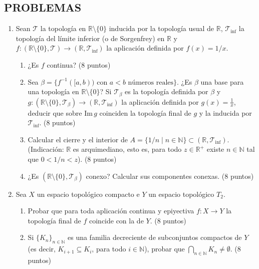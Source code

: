 \subsection*{PROBLEMAS}
\begin{enumerate}
    \item Sean $\mathcal{T}$ la topología en $\mathbb{R} \setminus \{0\}$ inducida por la topología usual de $\mathbb{R}$, $\mathcal{T}_{\inf}$ la topología del límite inferior (o de Sorgenfrey) en $\mathbb{R}$ y $f: (\mathbb{R} \setminus \{0\}, \mathcal{T}) \to (\mathbb{R}, \mathcal{T}_{\inf})$ la aplicación definida por $f(x) = 1/x$.
    \begin{enumerate}[label=(\alph*)]
        \item ¿Es $f$ continua? \hfill (8 puntos)
        \item Sea $\beta = \{f^{-1}([a, b)) \text{ con } a < b \text{ números reales}\}$. ¿Es $\beta$ una base para una topología en $\mathbb{R} \setminus \{0\}$? Si $\mathcal{T}_\beta$ es la topología definida por $\beta$ y $g: (\mathbb{R} \setminus \{0\}, \mathcal{T}_\beta) \to (\mathbb{R}, \mathcal{T}_{\inf})$ la aplicación definida por $g(x) = \frac{1}{x}$, deducir que sobre $\text{Im}\,g$ coinciden la topología final de $g$ y la inducida por $\mathcal{T}_{\inf}$. \hfill (8 puntos)
        \item Calcular el cierre y el interior de $A = \{1/n \mid n \in \mathbb{N}\} \subset (\mathbb{R}, \mathcal{T}_{\inf})$. (Indicación: $\mathbb{R}$ es arquimediano, esto es, para todo $z \in \mathbb{R}^+$ existe $n \in \mathbb{N}$ tal que $0 < 1/n < z$). \hfill (8 puntos)
        \item ¿Es $(\mathbb{R} \setminus \{0\}, \mathcal{T}_\beta)$ conexo? Calcular sus componentes conexas. \hfill (8 puntos)
    \end{enumerate}
    
    \item Sea $X$ un espacio topológico compacto e $Y$ un espacio topológico $T_2$.
    \begin{enumerate}[label=(\alph*)]
        \item Probar que para toda aplicación continua y epiyectiva $f: X \to Y$ la topología final de $f$ coincide con la de $Y$. \hfill (8 puntos)
        \item Si $\{K_n\}_{n \in \mathbb{N}}$ es una familia decreciente de subconjuntos compactos de $Y$ (es decir, $K_{i+1} \subseteq K_i$, para todo $i \in \mathbb{N}$), probar que $\displaystyle \bigcap_{n \in \mathbb{N}} K_n \neq \emptyset$. \hfill (8 puntos)
    \end{enumerate}
\end{enumerate}

